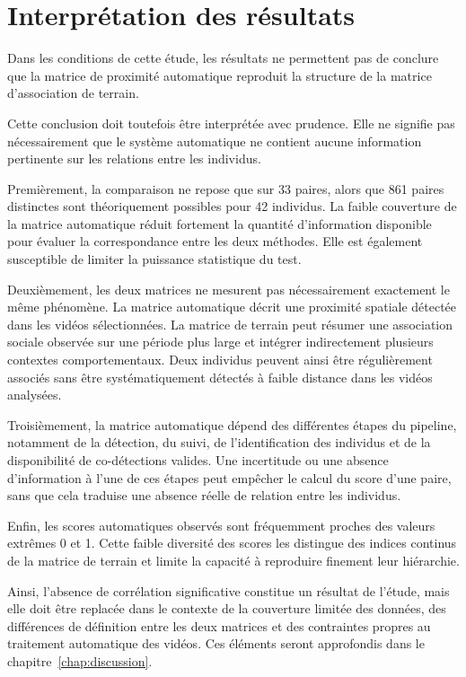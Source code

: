 \documentclass[11pt,a4paper]{report}
\begin{document}
\section{Interprétation des résultats}
\label{sec:interpretation_mantel}

Dans les conditions de cette étude, les résultats ne permettent pas de
conclure que la matrice de proximité automatique reproduit la structure
de la matrice d'association de terrain.

Cette conclusion doit toutefois être interprétée avec prudence. Elle ne
signifie pas nécessairement que le système automatique ne contient
aucune information pertinente sur les relations entre les individus.

Premièrement, la comparaison ne repose que sur 33 paires, alors que 861
paires distinctes sont théoriquement possibles pour 42 individus. La
faible couverture de la matrice automatique réduit fortement la
quantité d'information disponible pour évaluer la correspondance entre
les deux méthodes. Elle est également susceptible de limiter la
puissance statistique du test.

Deuxièmement, les deux matrices ne mesurent pas nécessairement
exactement le même phénomène. La matrice automatique décrit une
proximité spatiale détectée dans les vidéos sélectionnées. La matrice de
terrain peut résumer une association sociale observée sur une période
plus large et intégrer indirectement plusieurs contextes
comportementaux. Deux individus peuvent ainsi être régulièrement
associés sans être systématiquement détectés à faible distance dans les
vidéos analysées.

Troisièmement, la matrice automatique dépend des différentes étapes du
pipeline, notamment de la détection, du suivi, de l'identification des
individus et de la disponibilité de co-détections valides. Une
incertitude ou une absence d'information à l'une de ces étapes peut
empêcher le calcul du score d'une paire, sans que cela traduise une
absence réelle de relation entre les individus.

Enfin, les scores automatiques observés sont fréquemment proches des
valeurs extrêmes 0 et 1. Cette faible diversité des scores les distingue
des indices continus de la matrice de terrain et limite la capacité à
reproduire finement leur hiérarchie.

Ainsi, l'absence de corrélation significative constitue un résultat de
l'étude, mais elle doit être replacée dans le contexte de la couverture
limitée des données, des différences de définition entre les deux
matrices et des contraintes propres au traitement automatique des
vidéos. Ces éléments seront approfondis dans le
chapitre~\ref{chap:discussion}.
\end{document}

